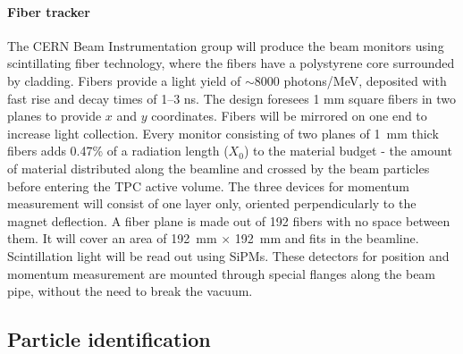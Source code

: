 \paragraph{Fiber tracker}
The CERN Beam Instrumentation group will produce
 the beam monitors %
 using scintillating fiber technology, where %
 the fibers have a polystyrene core surrounded by cladding. Fibers provide a light yield of $\sim$8000 photons/MeV, deposited with fast rise and decay times of 1--3 ns. The design foresees 1 mm square fibers in two planes to provide $x$ and $y$ coordinates. Fibers will be mirrored on one end to increase
light collection.  Every monitor consisting of two planes of 1~mm thick fibers adds 0.47\% of a radiation length ($X_0$) to the material budget - the amount of material distributed along the beamline and crossed by the beam particles before entering the TPC active volume. 
The three devices for momentum measurement will consist of one layer only, oriented perpendicularly to the magnet deflection.
A fiber plane is made out of 192 fibers with no space between them. It will cover an area of 192~mm $\times$ 192~mm and fits in the beamline.
Scintillation light will be read out using SiPMs.
%
These detectors for position and momentum measurement are 
mounted through special flanges along the beam pipe, without the need to break the vacuum.


\subsection{Particle identification}

